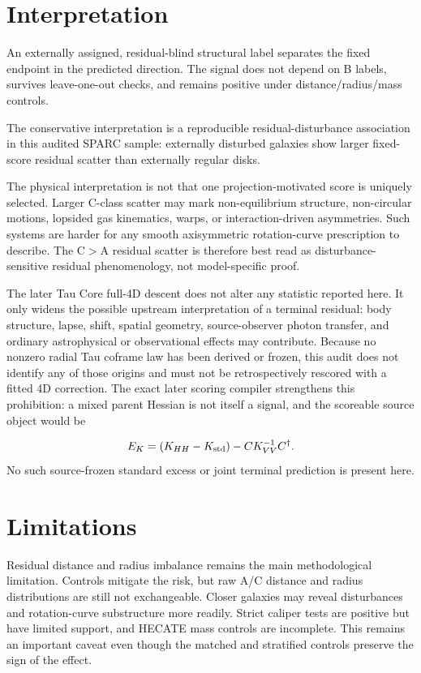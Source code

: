 \documentclass[11pt]{article}
\begin{document}
\section{Interpretation}
An externally assigned, residual-blind structural label separates the fixed endpoint in the predicted direction. The signal does not depend on B labels, survives leave-one-out checks, and remains positive under distance/radius/mass controls.

The conservative interpretation is a reproducible residual-disturbance association in this audited SPARC sample: externally disturbed galaxies show larger fixed-score residual scatter than externally regular disks.

The physical interpretation is not that one projection-motivated score is uniquely selected. Larger C-class scatter may mark non-equilibrium structure, non-circular motions, lopsided gas kinematics, warps, or interaction-driven asymmetries. Such systems are harder for any smooth axisymmetric rotation-curve prescription to describe. The C$>$A residual scatter is therefore best read as disturbance-sensitive residual phenomenology, not model-specific proof.

The later Tau Core full-4D descent does not alter any statistic reported here. It only widens the possible upstream interpretation of a terminal residual: body structure, lapse, shift, spatial geometry, source-observer photon transfer, and ordinary astrophysical or observational effects may contribute. Because no nonzero radial Tau coframe law has been derived or frozen, this audit does not identify any of those origins and must not be retrospectively rescored with a fitted 4D correction. The exact later scoring compiler strengthens this prohibition: a mixed parent Hessian is not itself a signal, and the scoreable source object would be

\begin{equation}
E_K=(K_{HH}-K_{\rm std})-CK_{VV}^{-1}C^\dagger.
\end{equation}
No such source-frozen standard excess or joint terminal prediction is present here.

\section{Limitations}
Residual distance and radius imbalance remains the main methodological limitation. Controls mitigate the risk, but raw A/C distance and radius distributions are still not exchangeable. Closer galaxies may reveal disturbances and rotation-curve substructure more readily. Strict caliper tests are positive but have limited support, and HECATE mass controls are incomplete. This remains an important caveat even though the matched and stratified controls preserve the sign of the effect.
\end{document}
